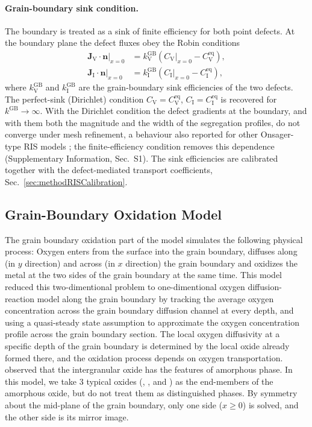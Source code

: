 \documentclass[3p,times,nonatbib]{elsarticle} %
\newcommand{\Vac}{\mathrm{V}}          %
\newcommand{\Int}{\mathrm{I}}          %
\newcommand{\GB}{\mathrm{GB}}
\begin{document}
\paragraph{Grain-boundary sink condition.}
The boundary is treated as a sink of finite efficiency for both point defects. At
the boundary plane the defect fluxes obey the Robin conditions
\begin{align}
\left.\mathbf{J}_{\Vac}\!\cdot\!\mathbf{n}\right|_{x=0}
 &= k_{\Vac}^{\GB}\left(\left.C_{\Vac}\right|_{x=0}-C_{\Vac}^{\mathrm{eq}}\right),
\label{eq:sink-vac}\\
\left.\mathbf{J}_{\Int}\!\cdot\!\mathbf{n}\right|_{x=0}
 &= k_{\Int}^{\GB}\left(\left.C_{\Int}\right|_{x=0}-C_{\Int}^{\mathrm{eq}}\right),
\label{eq:sink-int}
\end{align}
where \(k_{\Vac}^{\GB}\) and \(k_{\Int}^{\GB}\) are the grain-boundary sink
efficiencies of the two defects. The perfect-sink
(Dirichlet) condition \(C_{\Vac}=C_{\Vac}^{\mathrm{eq}}\),
\(C_{\Int}=C_{\Int}^{\mathrm{eq}}\) is recovered for \(k^{\GB}\to\infty\). With the
Dirichlet condition the defect gradients at the boundary, and with them both the
magnitude and the width of the segregation profiles, do not converge under mesh
refinement, a behaviour also reported for other Onsager-type RIS models
\cite{oplinger2026radiationinduceda}; the finite-efficiency condition removes
this dependence (Supplementary Information, Sec.~S1). The sink efficiencies
are calibrated together with the defect-mediated transport coefficients,
Sec.~\ref{sec:methodRISCalibration}.

\subsection{Grain-Boundary Oxidation Model}
\label{sec:methodGBOxidation}

The grain boundary oxidation part of the model simulates the following physical process: Oxygen enters from the surface into the grain boundary, diffuses along (in \(y\) direction) and across (in \(x\) direction) the grain boundary and oxidizes the metal at the two sides of the grain boundary at the same time. This model reduced this two-dimentional problem to one-dimentional oxygen diffusion-reaction model along the grain boundary by tracking the average oxygen concentration across the grain boundary diffusion channel at every depth, and using a quasi-steady state assumption to approximate the oxygen concentration profile across the grain boundary section. The local oxygen diffusivity at a specific depth of the grain boundary is determined by the local oxide already formed there, and the oxidation process depends on oxygen transportation. \textcite{deng2017effect} observed that the intergranular oxide has the features of amorphous phase. In this model, we take 3 typical oxides (, , and )
as the end-members of the amorphous oxide, but do not treat them as distinguished phases. By symmetry about the mid-plane of the grain boundary, only one side (\(x\ge 0\)) is solved, and the other side is its mirror image.
\end{document}
